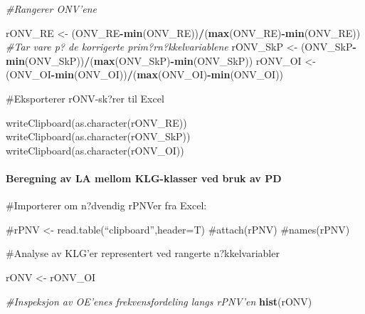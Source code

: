 \documentclass[]{article}
\newenvironment{Shaded}{\begin{snugshade}}{\end{snugshade}}
\newcommand{\CommentTok}[1]{\textcolor[rgb]{0.56,0.35,0.01}{\textit{#1}}}
\newcommand{\KeywordTok}[1]{\textcolor[rgb]{0.13,0.29,0.53}{\textbf{#1}}}
\newcommand{\NormalTok}[1]{#1}
\newcommand{\OperatorTok}[1]{\textcolor[rgb]{0.81,0.36,0.00}{\textbf{#1}}}
\newcommand{\StringTok}[1]{\textcolor[rgb]{0.31,0.60,0.02}{#1}}
\let\oldparagraph\paragraph
\renewcommand{\paragraph}[1]{\oldparagraph{#1}\mbox{}}
\begin{document}
\begin{Shaded}
\begin{Highlighting}[]
\CommentTok{#Rangerer ONV'ene}

\NormalTok{rONV_RE <-}\StringTok{ }\NormalTok{(ONV_RE}\OperatorTok{-}\KeywordTok{min}\NormalTok{(ONV_RE))}\OperatorTok{/}\NormalTok{(}\KeywordTok{max}\NormalTok{(ONV_RE)}\OperatorTok{-}\KeywordTok{min}\NormalTok{(ONV_RE)) }\CommentTok{#Tar vare p? de korrigerte prim?rn?kkelvariablene}
\NormalTok{rONV_SkP <-}\StringTok{ }\NormalTok{(ONV_SkP}\OperatorTok{-}\KeywordTok{min}\NormalTok{(ONV_SkP))}\OperatorTok{/}\NormalTok{(}\KeywordTok{max}\NormalTok{(ONV_SkP)}\OperatorTok{-}\KeywordTok{min}\NormalTok{(ONV_SkP))}
\NormalTok{rONV_OI <-}\StringTok{ }\NormalTok{(ONV_OI}\OperatorTok{-}\KeywordTok{min}\NormalTok{(ONV_OI))}\OperatorTok{/}\NormalTok{(}\KeywordTok{max}\NormalTok{(ONV_OI)}\OperatorTok{-}\KeywordTok{min}\NormalTok{(ONV_OI))}
\end{Highlighting}
\end{Shaded}

\#Eksporterer rONV-sk?rer til Excel

writeClipboard(as.character(rONV\_RE))
writeClipboard(as.character(rONV\_SkP))
writeClipboard(as.character(rONV\_OI))

\hypertarget{beregning-av-la-mellom-klg-klasser-ved-bruk-av-pd-1}{%
\paragraph{Beregning av LA mellom KLG-klasser ved bruk av
PD}\label{beregning-av-la-mellom-klg-klasser-ved-bruk-av-pd-1}}

\#Importerer om n?dvendig rPNVer fra Excel:

\#rPNV \textless{}- read.table(``clipboard'',header=T) \#attach(rPNV)
\#names(rPNV)

\#Analyse av KLG'er representert ved rangerte n?kkelvariabler

\begin{Shaded}
\begin{Highlighting}[]
\NormalTok{rONV <-}\StringTok{ }\NormalTok{rONV_OI}

\CommentTok{#Inspeksjon av OE'enes frekvensfordeling langs rPNV'en}
\KeywordTok{hist}\NormalTok{(rONV)}
\end{Highlighting}
\end{Shaded}
\end{document}

